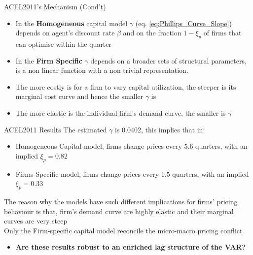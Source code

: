 \documentclass[11pt]{beamer}
\begin{document}

\begin{frame}{ACEL2011's Mechanism (Cond't)}
\begin{itemize}
    \item In the \textbf{Homogeneous} capital model $\gamma$ (eq. \ref{eq:Phillips_Curve_Slope}) depends on agent's discount rate $\beta$ and on the fraction $1 -\xi_p$ of firms that can optimise within the quarter
    \item In the \textbf{Firm Specific} $\gamma$ depends on a broader sets of structural parameters, is a non linear function with a non trivial representation.
    \item The more costly is for a firm to vary capital utilization, the steeper is its marginal cost curve and hence the smaller $\gamma$ is
    \item The more elastic is the individual firm's demand curve, the smaller is $\gamma$
\end{itemize}
\end{frame}


\begin{frame}{ACEL2011 Results}
    The estimated $\gamma$ is 0.0402, this implies that in:
    \begin{itemize}
        \item Homogeneous Capital model, firms change prices every 5.6 quarters, with an implied $\xi_p = 0.82 $
        \item Firms Specific model, firms change prices every 1.5 quarters, with an implied $\xi_p = 0.33 $
    \end{itemize}
The reason why the models have such different implications for firms' pricing behaviour is that, firm's demand curve are highly elastic and their marginal curves are very steep
\\
Only the Firm-specific capital model reconcile the micro-macro pricing conflict
\vspace{0.5cm}
\pause

\begin{itemize}
    \item \textbf{Are these results robust to an enriched lag structure of the VAR?}
\end{itemize}
\end{frame}
\end{document}
